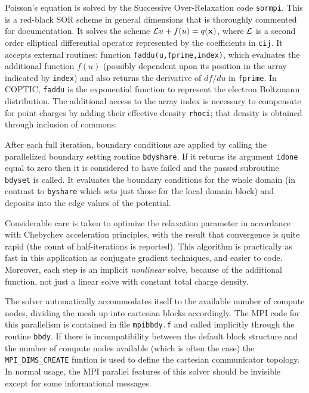 \documentclass[12pt]{article}
\begin{document}
Poisson's equation is solved by the Successive Over-Relaxation code
\verb!sormpi!. This is a red-black SOR scheme in general dimensions
that is thoroughly commented for documentation. It solves the scheme
${\cal L}u+f(u) = q({\bf x})$, where ${\cal L}$ is a second order
elliptical differential operator represented by the coefficients in
\verb!cij!. It accepts external routines: function
\verb!faddu(u,fprime,index)!, which evaluates the additional function
$f(u)$ (possibly dependent upon its position in the array indicated by
\verb!index!) and also returns the derivative of $df/du$ in
\verb!fprime!. In COPTIC, \verb!faddu! is the exponential function to
represent the electron Boltzmann distribution. The additional access
to the array index is necessary to compensate for point charges by
adding their effective density \verb!rhoci!; that density is obtained
through inclusion of commons. 

After each full iteration, boundary conditions are applied by calling
the parallelized boundary setting routine \verb!bdyshare!. If it
returns its argument \verb!idone!  equal to zero then it is
considered to have failed and the passed subroutine \verb!bdyset! is
called. It evaluates the boundary conditions for the whole domain (in
contrast to \verb!byshare! which sets just those for the local domain
block) and deposits into the edge values of the potential.

Considerable care is taken to optimize the relaxation parameter in
accordance with Chebychev acceleration principles, with the result
that convergence is quite rapid (the count of half-iterations is
reported). This algorithm is practically as fast in this application as
conjugate gradient techniques, and easier to code. Moreover, each step is an
implicit \emph{nonlinear} solve, because of the additional function,
not just a linear solve with constant total charge density.

The solver automatically accommodates itself to the available number
of compute nodes, dividing the mesh up into cartesian blocks
accordingly.  The MPI code for this parallelism is contained in file
\verb!mpibbdy.f! and called implicitly through the routine
\verb!bbdy!. If there is incompatibility between the default block
structure and the number of compute nodes available (which is often
the case) the \verb!MPI_DIMS_CREATE! funtion is used to define the
cartesian communicator topology. In normal usage, the MPI parallel
features of this solver should be invisible except for some
informational messages.  
\end{document}
